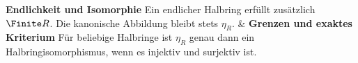 \begin{BandUebersicht}
\textbf{Endlichkeit und Isomorphie}
Ein endlicher Halbring erfüllt zusätzlich
\(\Finite R\). Die kanonische Abbildung bleibt stets \(\eta_R\).
&
\textbf{Grenzen und exaktes Kriterium}
Für beliebige Halbringe ist \(\eta_R\) genau dann ein
Halbringisomorphismus, wenn es injektiv und surjektiv ist.
 \\
\addlinespace[.8ex]
\end{BandUebersicht}
